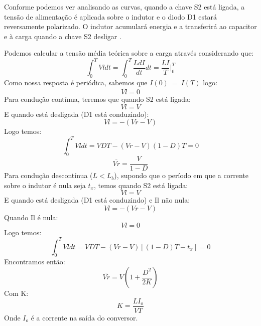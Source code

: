 \documentclass{article}
\begin{document}
Conforme podemos ver analisando as curvas, quando a chave S2 está ligada, a tensão de alimentação é aplicada sobre o indutor e o diodo D1 estará reversamente polarizado. O indutor acumulará energia e a transferirá ao capacitor e à carga quando a chave S2 desligar \cite{bb:dcdc}.

Podemos calcular a tensão média teórica sobre a carga através considerando que:
\begin{equation}
\int_{0}^{T}Vl dt = \int_{0}^{T}\frac{LdI}{dt} dt = \frac{LI}{T}\bigg\rvert_0^T
\end{equation}
Como nossa resposta é periódica, sabemos que $I(0)\ =\ I(T)$ logo:
\begin{equation}
\overline{Vl} = 0
\end{equation}
Para condução contínua, teremos que quando S2 está ligada:
\begin{equation}
	Vl = V
\end{equation}
E quando está desligada (D1 está conduzindo):
\begin{equation}
	Vl = -(Vr - V)
\end{equation}
Logo temos:
\begin{equation}
	\int_{0}^{T}Vl dt = VDT - (Vr - V)(1 - D)T = 0
\end{equation}
\begin{equation}
\overline{Vr} = \frac{V}{1 - D}
\end{equation}
Para condução descontínua ($L < L_b$), supondo que o período em que a corrente sobre o indutor é nula seja $t_x$, temos quando S2 está ligada:
\begin{equation}
Vl = V
\end{equation}
E quando está desligada (D1 está conduzindo) e Il não nula:
\begin{equation}
Vl = -(Vr - V)
\end{equation}
Quando Il é nula:
\begin{equation}
Vl = 0
\end{equation}
Logo temos:
\begin{equation}
\int_{0}^{T}Vl dt = VDT - (Vr - V)[(1 - D)T - t_x] = 0
\end{equation}
Encontramos então:
\begin{equation}
\overline{Vr} = V(1 + \frac{D^2}{2K})
\end{equation}
Com K:
\begin{equation}
	K = \frac{LI_o}{VT}
\end{equation}
Onde $I_o$ é a corrente na saída do conversor.
\end{document}
